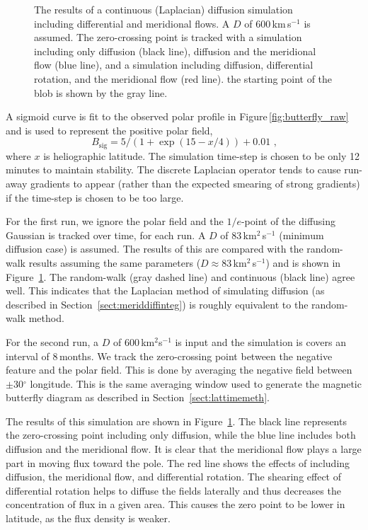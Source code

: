 \begin{figure}[!t]
\caption[Continuous diffusion and flow simulation.]{The results of a continuous (Laplacian) diffusion simulation including differential and meridional flows. A $D$ of 600\,km\,s$^{-1}$ is assumed. The zero-crossing point is tracked with a simulation including only diffusion (black line), diffusion and the meridional flow (blue line), and a simulation including diffusion, differential rotation, and the meridional flow (red line). the starting point of the blob is shown by the gray line.}
\label{fig:comprandcont}
\end{figure}

A sigmoid curve is fit to the observed polar profile in Figure\,\ref{fig:butterfly_raw} and is used to represent the positive polar field,
\begin{equation}
B_{\mathrm{sig}} = 5/(1+\exp(15-x/4))+0.01 \mbox{ ,}
\end{equation}
where $x$ is heliographic latitude. The simulation time-step is chosen to be only 12\,minutes to maintain stability. The discrete Laplacian operator tends to cause run-away gradients to appear (rather than the expected smearing of strong gradients) if the time-step is chosen to be too large. 

For the first run, we ignore the polar field and the $1/e$-point of the diffusing Gaussian is tracked over time, for each run. A $D$ of 83\,km$^2$\,s$^{-1}$ (minimum diffusion case) is assumed. The results of this are compared with the random-walk results assuming the same parameters ($D\approx83$\,km$^2$\,s$^{-1}$) and is shown in Figure~\ref{fig:comprandcont}. The random-walk (gray dashed line) and continuous (black line) agree well. This indicates that the Laplacian method of simulating diffusion (as described in Section~\ref{sect:meriddiffinteg}) is roughly equivalent to the random-walk method.

For the second run, a $D$ of 600\,km$^2$s$^{-1}$ is input and the simulation is covers an interval of 8\,months. We track the zero-crossing point between the negative feature and the polar field. This is done by averaging the negative field between $\pm$30$^{\circ}$ longitude. This is the same averaging window used to generate the magnetic butterfly diagram as described in Section~\ref{sect:lattimemeth}.

The results of this simulation are shown in Figure~\ref{fig:comprandcont}. The black line represents the zero-crossing point including only diffusion, while the blue line includes both diffusion and the meridional flow. It is clear that the meridional flow plays a large part in moving flux toward the pole. The red line shows the effects of including diffusion, the meridional flow, and differential rotation. The shearing effect of differential rotation helps to diffuse the fields laterally and thus decreases the concentration of flux in a given area. This causes the zero point to be lower in latitude, as the flux density is weaker.

